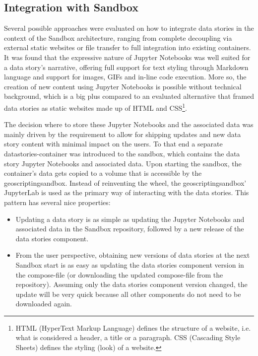 \documentclass[11pt, a4paper, oneside, parskip=full-]{scrartcl}
\begin{document}
\subsection{Integration with Sandbox}
Several possible approaches were evaluated on how to integrate data stories in
the context of the Sandbox architecture, ranging from complete decoupling via
external static websites or file transfer to full integration into existing
containers. It was found that the expressive nature of Jupyter Notebooks was
well suited for a data story's narrative, offering full support for text styling
through Markdown language and support for images, GIFs and in-line code
execution. More so, the creation of new content using Jupyter Notebooks is
possible without technical background, which is a big plus compared to an
evaluated alternative that framed data stories as static websites made up of
HTML and CSS\footnote{HTML (HyperText Markup Language) defines the structure of
a website, i.e. what is considered a header, a title or a paragraph. CSS
(Cascading Style Sheets) defines the styling (look) of a website.}.

The decision where to store these Jupyter Notebooks and the associated data was
mainly driven by the requirement to allow for shipping updates and new data
story content with minimal impact on the users. To that end a separate
datastories-container was introduced to the sandbox, which contains the data
story Jupyter Notebooks and associated data. Upon starting the sandbox, the
container's data gets copied to a volume that is accessible by the
geoscriptingsandbox. Instead of reinventing the wheel, the geoscriptingsandbox'
JupyterLab is used as the primary way of interacting with the data stories. This
pattern has several nice properties:
\begin{itemize}
  \item Updating a data story is as simple as updating the Jupyter Notebooks and
  associated data in the Sandbox repository, followed by a new release of the
  data stories component.
  \item From the user perspective, obtaining new versions of data stories at the
  next Sandbox start is as easy as updating the data stories component version
  in the compose-file (or downloading the updated compose-file from the
  repository). Assuming only the data stories component version changed, the
  update will be very quick because all other components do not need to be
  downloaded again.
\end{itemize}
\end{document}
